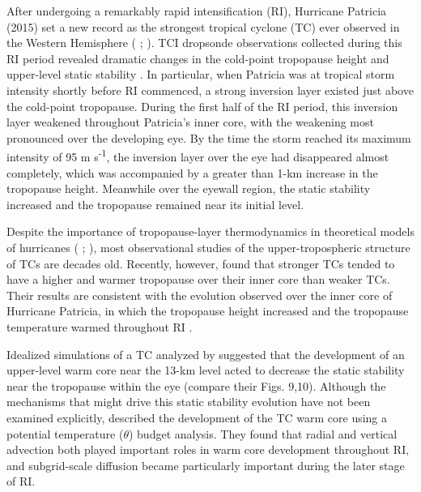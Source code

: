 \documentclass{ametsoc}
\begin{document}
After undergoing a remarkably rapid intensification (RI), Hurricane Patricia (2015) set a new record as the strongest tropical cyclone (TC) ever observed in the Western Hemisphere (\citeauthor{Kimberlainetal2016} \citeyear{Kimberlainetal2016}; \citeauthor{Rogersetal2017} \citeyear{Rogersetal2017}).
TCI dropsonde observations collected during this RI period revealed dramatic changes in the cold-point tropopause height and upper-level static stability \citep{DuranMolinari2018}.
In particular, when Patricia was at tropical storm intensity shortly before RI commenced, a strong inversion layer existed just above the cold-point tropopause.
During the first half of the RI period, this inversion layer weakened throughout Patricia's inner core, with the weakening most pronounced over the developing eye.
By the time the storm reached its maximum intensity of 95 m s\textsuperscript{-1}, the inversion layer over the eye had disappeared almost completely, which was accompanied by a greater than 1-km increase in the tropopause height.
Meanwhile over the eyewall region, the static stability increased and the tropopause remained near its initial level.

Despite the importance of tropopause-layer thermodynamics in theoretical models of hurricanes (\citeauthor{EmanuelRotunno2011} \citeyear{EmanuelRotunno2011}; \citeauthor{Emanuel2012} \citeyear{Emanuel2012}), most observational studies of the upper-tropospheric structure of TCs are decades old.
Recently, however, \cite{KomaromiDoyle2017} found that stronger TCs tended to have a higher and warmer tropopause over their inner core than weaker TCs.
Their results are consistent with the evolution observed over the inner core of Hurricane Patricia, in which the tropopause height increased and the tropopause temperature warmed throughout RI \citep{DuranMolinari2018}.

Idealized simulations of a TC analyzed by \cite{OhnoSatoh2015} suggested that the development of an upper-level warm core near the 13-km level acted to decrease the static stability near the tropopause within the eye (compare their Figs. 9,10).
Although the mechanisms that might drive this static stability evolution have not been examined explicitly, \cite{SternZhang2013} described the development of the TC warm core using a potential temperature ($\theta$) budget analysis.
They found that radial and vertical advection both played important roles in warm core development throughout RI, and subgrid-scale diffusion became particularly important during the later stage of RI.
\end{document}
